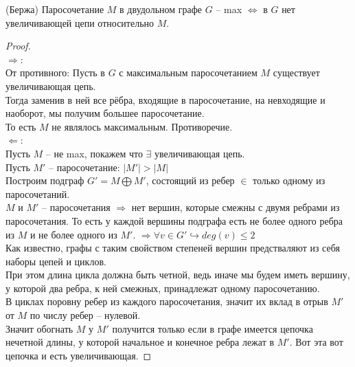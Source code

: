 \begin{theorem}
	(Бержа) Паросочетание $M$ в двудольном графе  $G$ -- max $\iff $ в $G$ нет увеличивающей цепи относительно $M$.
\end{theorem}

\begin{proof} \ \\
	 $\Rightarrow$: \\
		От противного: Пусть в $G$ с максимальным паросочетанием $M$ существует увеличивающая цепь. \\
		Тогда заменив в ней все рёбра, входящие в паросочетание, на невходящие и наоборот, мы получим большее паросочетание.\\
		То есть $M$ не являлось максимальным. Противоречие.\\
	$\Leftarrow$: \\
	 	Пусть $M$ -- не max, покажем что $\exists$ увеличивающая цепь.\\
		Пусть $M'$ -- паросочетание: $\lvert M' \rvert > \lvert M \rvert $\\
		Построим подграф  $G' = M \bigoplus M'$, состоящий из ребер $\in$ только одному из паросочетаний.\\
		$M$ и  $M'$ -- паросочетания  $\Rightarrow$ нет вершин, которые смежны с двумя ребрами из паросочетания. То есть у каждой вершины подграфа есть не более одного ребра из $M$ и не более одного из  $M'$.  $\Rightarrow \forall v \in G' \hookrightarrow deg(v) \leq 2$\\
		Как известно, графы с таким свойством степеней вершин предстваляют из себя наборы цепей и циклов. \\
		При этом длина цикла должна быть четной, ведь иначе мы будем иметь вершину, у которой два ребра, к ней смежных, принадлежат одному паросочетанию.\\
		В циклах поровну ребер из каждого паросочетания, значит их вклад в отрыв $M'$ от $M$ по числу ребер -- нулевой.\\
		Значит обогнать $M$ у  $M'$ получится только если в графе имеется цепочка нечетной длины, у которой начальное и конечное ребра лежат в $M'$. Вот эта вот цепочка и есть увеличивающая.
\end{proof}

